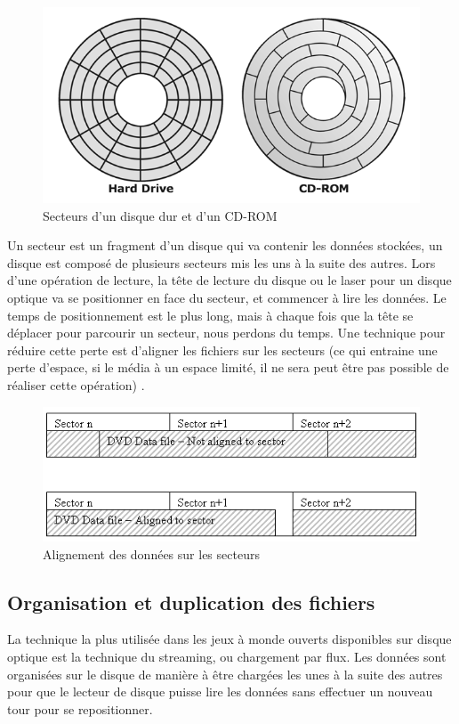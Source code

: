 \documentclass[a4paper, 11pt]{article} %
\begin{document}
\begin{figure}[!h]%
\begin{center} 
\includegraphics[width=0.60\columnwidth]{images/disk_sector.png}%
\caption{Secteurs d'un disque dur et d'un CD-ROM}%
\label{}%
\end{center}
\end{figure}

Un secteur est un fragment d'un disque qui va contenir les données stockées, un disque est composé de plusieurs secteurs mis les uns à la suite des autres. Lors d'une opération de lecture, la tête de lecture du disque ou le laser pour un disque optique va se positionner en face du secteur, et commencer à lire les données. Le temps de positionnement est le plus long, mais à chaque fois que la tête se déplacer pour parcourir un secteur, nous perdons du temps. 
Une technique pour réduire cette perte est d'aligner les fichiers sur les secteurs (ce qui entraine une perte d'espace, si le média à un espace limité, il ne sera peut être pas possible de réaliser cette opération) \cite{industry:streaming-for-loading}.

\begin{figure}[!h]%
\begin{center} 
\includegraphics[width=0.60\columnwidth]{images/sector_storage.png}%
\caption{Alignement des données sur les secteurs}%
\label{}%
\end{center}
\end{figure}

\newpage
\subsection{Organisation et duplication des fichiers}
La technique la plus utilisée dans les jeux à monde ouverts disponibles sur disque optique est la technique du streaming, ou chargement par flux. Les données sont organisées sur le disque de manière à être chargées les unes à la suite des autres pour que le lecteur de disque puisse lire les données sans effectuer un nouveau tour pour se repositionner.
\end{document}
